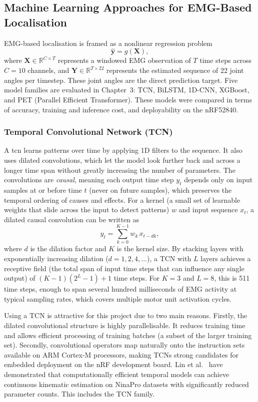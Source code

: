 \documentclass[11pt]{article}
\begin{document}
\subsection{Machine Learning Approaches for EMG-Based Localisation}
EMG-based localisation is framed as a nonlinear regression problem
\begin{equation}
\hat{\mathbf{y}} = g(\mathbf{X}),
\end{equation}
where $\mathbf{X} \in \mathbb{R}^{C \times T}$ represents a windowed EMG observation of $T$ time steps across $C = 10$ channels, and $\hat{\mathbf{Y}} \in \mathbb{R}^{T \times 22}$ represents the estimated sequence of 22 joint angles per timestep. These joint angles are the direct prediction target. Five model families are evaluated in Chapter~3: TCN, BiLSTM, 1D-CNN, XGBoost, and PET (Parallel Efficient Transformer). These models were compared in terms of accuracy, training and inference cost, and deployability on the nRF52840.


\subsubsection{Temporal Convolutional Network (TCN)}
A \gls{tcn} learns patterns over time by applying 1D filters to the sequence. It also uses dilated convolutions, which let the model look further back and across a longer time span without greatly increasing the number of parameters. The convolutions are \emph{causal}, meaning each output time step $y_t$ depends only on input samples at or before time $t$ (never on future samples), which preserves the temporal ordering of causes and effects. For a kernel (a small set of learnable weights that slide across the input to detect patterns) $w$ and input sequence $x_t$, a dilated causal convolution can be written as
\begin{equation}
y_t = \sum_{k=0}^{K-1} w_k \, x_{t-dk},
\end{equation}
where $d$ is the dilation factor and $K$ is the kernel size. By stacking layers with exponentially increasing dilation ($d = 1, 2, 4, \ldots$), a TCN with $L$ layers achieves a receptive field (the total span of input time steps that can influence any single output) of $(K-1)(2^L - 1) + 1$ time steps. For $K=3$ and $L=8$, this is 511 time steps, enough to span several hundred milliseconds of EMG activity at typical sampling rates, which covers multiple motor unit activation cycles.

Using a TCN is attractive for this project due to two main reasons. Firstly, the dilated convolutional structure is highly parallelisable. It reduces training time and allows efficient processing of training batches (a subset of the larger training set). Secondly, convolutional operators map naturally onto the instruction sets available on ARM Cortex-M processors, making TCNs strong candidates for embedded deployment on the nRF development board. Lin et al.\ \cite{lin2025parallel} have demonstrated that computationally efficient temporal models can achieve continuous kinematic estimation on NinaPro datasets with significantly reduced parameter counts. This includes the TCN family.
\end{document}
